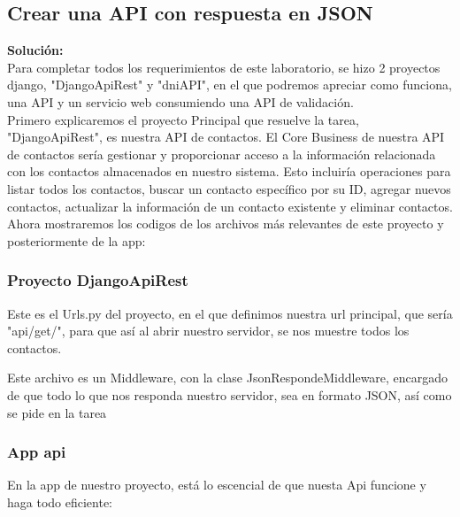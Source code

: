 \documentclass{article}
\begin{document}
\subsection{Crear una API con respuesta en JSON}
\textbf{Solución:} \\
Para completar todos los requerimientos de este laboratorio, se hizo 2 proyectos django, "DjangoApiRest" y "dniAPI", en el que podremos apreciar como funciona, una API y un servicio web consumiendo una API de validación. \\

Primero explicaremos el proyecto Principal que resuelve la tarea, "DjangoApiRest", es nuestra API de contactos. El Core Business de nuestra API de contactos sería gestionar y proporcionar acceso a la información relacionada con los contactos almacenados en nuestro sistema. Esto incluiría operaciones para listar todos los contactos, buscar un contacto específico por su ID, agregar nuevos contactos, actualizar la información de un contacto existente y eliminar contactos.\\

Ahora mostraremos los codigos de los archivos más relevantes de este proyecto y posteriormente de la app:

\subsubsection{Proyecto DjangoApiRest}

    

    Este es el Urls.py del proyecto, en el que definimos nuestra url principal, que sería "api/get/", para que así al abrir nuestro servidor, se nos muestre todos los contactos.

    

    Este archivo es un Middleware, con la clase JsonRespondeMiddleware, encargado de que todo lo que nos responda nuestro servidor, sea en formato JSON, así como se pide en la tarea

\subsubsection{App api}
En la app de nuestro proyecto, está lo escencial de que nuesta Api funcione y haga todo eficiente:

   
\end{document}
